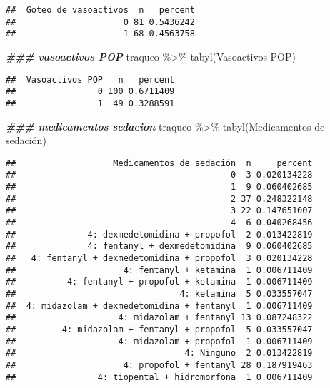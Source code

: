 \documentclass[
]{article}
\newenvironment{Shaded}{\begin{snugshade}}{\end{snugshade}}
\newcommand{\AttributeTok}[1]{\textcolor[rgb]{0.77,0.63,0.00}{#1}}
\newcommand{\DocumentationTok}[1]{\textcolor[rgb]{0.56,0.35,0.01}{\textbf{\textit{#1}}}}
\newcommand{\FunctionTok}[1]{\textcolor[rgb]{0.00,0.00,0.00}{#1}}
\newcommand{\NormalTok}[1]{#1}
\newcommand{\SpecialCharTok}[1]{\textcolor[rgb]{0.00,0.00,0.00}{#1}}
\newcommand{\StringTok}[1]{\textcolor[rgb]{0.31,0.60,0.02}{#1}}
\begin{document}
\begin{verbatim}
##  Goteo de vasoactivos  n   percent
##                     0 81 0.5436242
##                     1 68 0.4563758
\end{verbatim}

\begin{Shaded}
\begin{Highlighting}[]
\DocumentationTok{\#\#\# vasoactivos POP}
\NormalTok{traqueo }\SpecialCharTok{\%\textgreater{}\%}
  \FunctionTok{tabyl}\NormalTok{(}\StringTok{\textasciigrave{}}\AttributeTok{Vasoactivos POP}\StringTok{\textasciigrave{}}\NormalTok{)}
\end{Highlighting}
\end{Shaded}

\begin{verbatim}
##  Vasoactivos POP   n   percent
##                0 100 0.6711409
##                1  49 0.3288591
\end{verbatim}

\begin{Shaded}
\begin{Highlighting}[]
\DocumentationTok{\#\#\# medicamentos sedacion}
\NormalTok{traqueo }\SpecialCharTok{\%\textgreater{}\%}
  \FunctionTok{tabyl}\NormalTok{(}\StringTok{\textasciigrave{}}\AttributeTok{Medicamentos de sedación}\StringTok{\textasciigrave{}}\NormalTok{)}
\end{Highlighting}
\end{Shaded}

\begin{verbatim}
##                   Medicamentos de sedación  n     percent
##                                          0  3 0.020134228
##                                          1  9 0.060402685
##                                          2 37 0.248322148
##                                          3 22 0.147651007
##                                          4  6 0.040268456
##              4: dexmedetomidina + propofol  2 0.013422819
##              4: fentanyl + dexmedetomidina  9 0.060402685
##   4: fentanyl + dexmedetomidina + propofol  3 0.020134228
##                     4: fentanyl + ketamina  1 0.006711409
##          4: fentanyl + propofol + ketamina  1 0.006711409
##                                4: ketamina  5 0.033557047
##  4: midazolam + dexmedetomidina + fentanyl  1 0.006711409
##                    4: midazolam + fentanyl 13 0.087248322
##         4: midazolam + fentanyl + propofol  5 0.033557047
##                    4: midazolam + propofol  1 0.006711409
##                                 4: Ninguno  2 0.013422819
##                     4: propofol + fentanyl 28 0.187919463
##                4: tiopental + hidromorfona  1 0.006711409
\end{verbatim}
\end{document}

